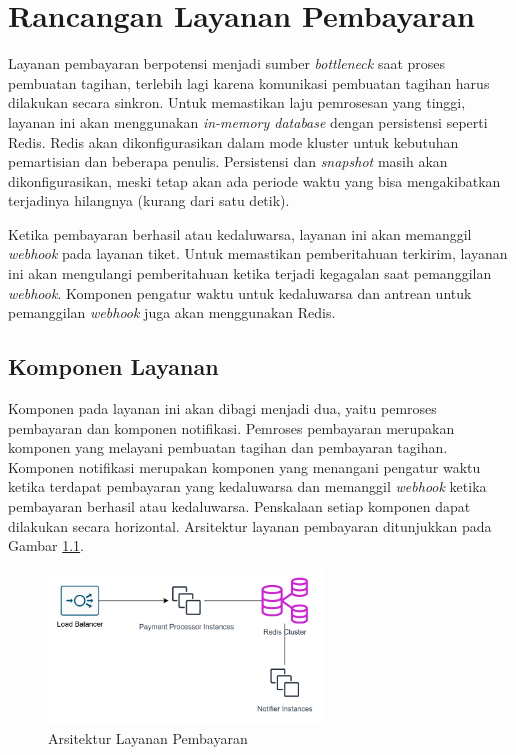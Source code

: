 \chapter{Rancangan Layanan Pembayaran}
\label{apx:payment-service}

Layanan pembayaran berpotensi menjadi sumber \textit{bottleneck} saat proses pembuatan tagihan, terlebih lagi karena komunikasi pembuatan tagihan harus dilakukan secara sinkron. Untuk memastikan laju pemrosesan yang tinggi, layanan ini akan menggunakan \textit{in-memory database} dengan persistensi seperti Redis. Redis akan dikonfigurasikan dalam mode kluster untuk kebutuhan pemartisian dan beberapa penulis. Persistensi dan \textit{snapshot} masih akan dikonfigurasikan, meski tetap akan ada periode waktu yang bisa mengakibatkan terjadinya hilangnya (kurang dari satu detik).

Ketika pembayaran berhasil atau kedaluwarsa, layanan ini akan memanggil \textit{webhook} pada layanan tiket. Untuk memastikan pemberitahuan terkirim, layanan ini akan mengulangi pemberitahuan ketika terjadi kegagalan saat pemanggilan \textit{webhook}. Komponen pengatur waktu untuk kedaluwarsa dan antrean untuk pemanggilan \textit{webhook} juga akan menggunakan Redis.

\section{Komponen Layanan}

Komponen pada layanan ini akan dibagi menjadi dua, yaitu pemroses pembayaran dan komponen notifikasi. Pemroses pembayaran merupakan komponen yang melayani pembuatan tagihan dan pembayaran tagihan. Komponen notifikasi merupakan komponen yang menangani pengatur waktu ketika terdapat pembayaran yang kedaluwarsa dan  memanggil \textit{webhook} ketika pembayaran berhasil atau kedaluwarsa. Penskalaan setiap komponen dapat dilakukan secara horizontal. Arsitektur layanan pembayaran ditunjukkan pada Gambar \ref{fig:payment-service-deployment}.

\pagebreak

\begin{figure}[H]
    \centering
    \includegraphics[width=0.65\textwidth]{resources/chapter-3/payment-service.png}
    \caption{Arsitektur Layanan Pembayaran}
    \label{fig:payment-service-deployment}
\end{figure}

